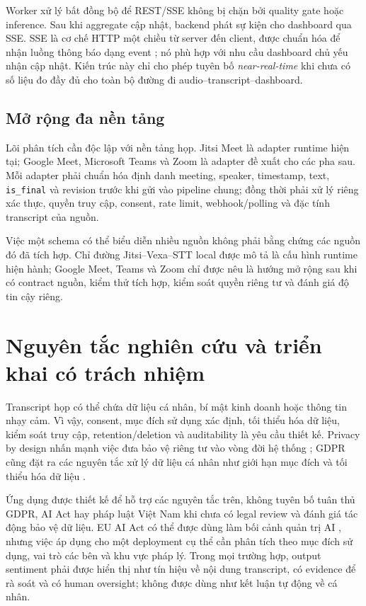 Worker xử lý bất đồng bộ để REST/SSE không bị chặn bởi quality gate hoặc inference. Sau khi aggregate cập nhật, backend phát sự kiện cho dashboard qua SSE. SSE là cơ chế HTTP một chiều từ server đến client, được chuẩn hóa để nhận luồng thông báo dạng event \cite{sse2015}; nó phù hợp với nhu cầu dashboard chủ yếu nhận cập nhật. Kiến trúc này chỉ cho phép tuyên bố \emph{near-real-time} khi chưa có số liệu đo đầy đủ cho toàn bộ đường đi audio--transcript--dashboard.

\subsection{Mở rộng đa nền tảng}
Lõi phân tích cần độc lập với nền tảng họp. Jitsi Meet là adapter runtime hiện tại; Google Meet, Microsoft Teams và Zoom là adapter đề xuất cho các pha sau. Mỗi adapter phải chuẩn hóa định danh meeting, speaker, timestamp, text, \texttt{is\_final} và revision trước khi gửi vào pipeline chung; đồng thời phải xử lý riêng xác thực, quyền truy cập, consent, rate limit, webhook/polling và đặc tính transcript của nguồn.

Việc một schema có thể biểu diễn nhiều nguồn không phải bằng chứng các nguồn đó đã tích hợp. Chỉ đường Jitsi--Vexa--STT local được mô tả là cấu hình runtime hiện hành; Google Meet, Teams và Zoom chỉ được nêu là hướng mở rộng sau khi có contract nguồn, kiểm thử tích hợp, kiểm soát quyền riêng tư và đánh giá độ tin cậy riêng.

\section{Nguyên tắc nghiên cứu và triển khai có trách nhiệm}
Transcript họp có thể chứa dữ liệu cá nhân, bí mật kinh doanh hoặc thông tin nhạy cảm. Vì vậy, consent, mục đích sử dụng xác định, tối thiểu hóa dữ liệu, kiểm soát truy cập, retention/deletion và auditability là yêu cầu thiết kế. Privacy by design nhấn mạnh việc đưa bảo vệ riêng tư vào vòng đời hệ thống \cite{cavoukian2011}; GDPR cũng đặt ra các nguyên tắc xử lý dữ liệu cá nhân như giới hạn mục đích và tối thiểu hóa dữ liệu \cite{gdpr2016}.

Ứng dụng được thiết kế để hỗ trợ các nguyên tắc trên, không tuyên bố tuân thủ GDPR, AI Act hay pháp luật Việt Nam khi chưa có legal review và đánh giá tác động bảo vệ dữ liệu. EU AI Act có thể được dùng làm bối cảnh quản trị AI \cite{euaiact2024}, nhưng việc áp dụng cho một deployment cụ thể cần phân tích theo mục đích sử dụng, vai trò các bên và khu vực pháp lý. Trong mọi trường hợp, output sentiment phải được hiển thị như tín hiệu về nội dung transcript, có evidence để rà soát và có human oversight; không được dùng như kết luận tự động về cá nhân.
